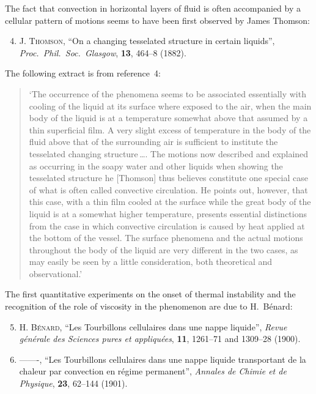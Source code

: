 \noindent The fact that convection in horizontal layers of fluid is often accompanied by
a cellular pattern of motions seems to have been first observed by James Thomson:

\begin{enumerate}
\setcounter{enumi}{3}

\item J. \textsc{Thomson}, ``On a changing tesselated structure in certain liquids'',
  \textit{Proc.\ Phil.\ Soc.\ Glasgow}, \textbf{13}, 464--8 (1882).

\end{enumerate}

\noindent The following extract is from reference~4:

\begin{quote}
`The occurrence of the phenomena seems to be associated essentially with
cooling of the liquid at its surface where exposed to the air, when the main
body of the liquid is at a temperature somewhat above that assumed by a thin
superficial film. A very slight excess of temperature in the body of the fluid
above that of the surrounding air is sufficient to institute the tesselated
changing structure\,\ldots. The motions now described and explained as occurring
in the soapy water and other liquids when showing the tesselated structure
he [Thomson] thus believes constitute one special case of what is often called
convective circulation. He points out, however, that this case, with a thin
film cooled at the surface while the great body of the liquid is at a somewhat
higher temperature, presents essential distinctions from the case in which
convective circulation is caused by heat applied at the bottom of the vessel.
The surface phenomena and the actual motions throughout the body of the
liquid are very different in the two cases, as may easily be seen by a little
consideration, both theoretical and observational.'
\end{quote}

\noindent The first quantitative experiments on the onset of thermal instability and the
recognition of the role of viscosity in the phenomenon are due to H.~B\'enard:

\begin{enumerate}
\setcounter{enumi}{4}

\item H. \textsc{B\'enard}, ``Les Tourbillons cellulaires dans une nappe liquide'',
  \textit{Revue g\'en\'erale des Sciences pures et appliqu\'ees}, \textbf{11},
  1261--71 and 1309--28 (1900).

\item -------, ``Les Tourbillons cellulaires dans une nappe liquide transportant de
  la chaleur par convection en r\'egime permanent'', \textit{Annales de Chimie et de
  Physique}, \textbf{23}, 62--144 (1901).

\end{enumerate}

